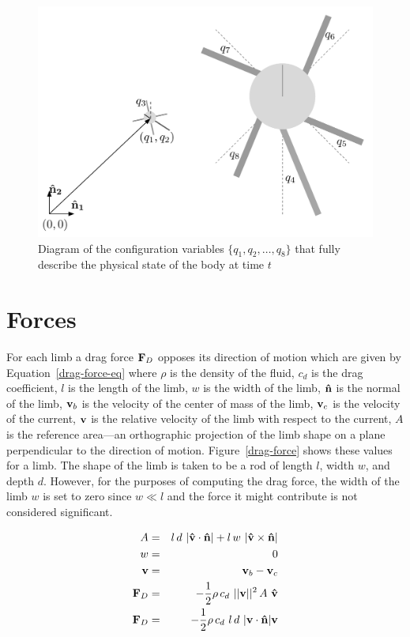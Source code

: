 \begin{figure}  
  \centering
  \includegraphics[scale=0.6]{fig/confvars-gs.pdf} 
  \caption[Diagram of configuration variables]{\label{confvars}Diagram
    of the configuration variables $\{q_1, q_2, \ldots, q_8\}$ that
    fully describe the physical state of the body at time $t$}
\end{figure}

\section{Forces}

For each limb a drag force $\mathbf{F}_D$ opposes its direction of motion
which are given by Equation~\ref{drag-force-eq} where $\rho$ is the
density of the fluid, $c_d$ is the drag coefficient, $l$ is the length
of the limb, $w$ is the width of the limb, $\mathbf{\hat{n}}$ is the normal of
the limb, $\mathbf{v}_b$ is the velocity of the center of mass of the limb,
$\mathbf{v}_c$ is the velocity of the current, $\mathbf{v}$ is the relative
velocity of the limb with respect to the current, $A$ is the reference
area---an orthographic projection of the limb shape on a plane
perpendicular to the direction of motion.  Figure~\ref{drag-force}
shows these values for a limb.  The shape of the limb is taken to be a
rod of length $l$, width $w$, and depth $d$.  However, for the
purposes of computing the drag force, the width of the limb $w$ is set
to zero since $w \ll l$ and the force it might contribute is not
considered significant.

\begin{eqnarray}
  A &=& l\,d~ |\mathbf{\hat{v}} \cdot \mathbf{\hat{n}}| + l\, w~|\mathbf{\hat{v}} \times \mathbf{\hat{n}}|\\
  w &=& 0 \\
  \mathbf{v} &=& \mathbf{v}_b - \mathbf{v}_c \\
  \mathbf{F}_D &=& -\frac{1}{2} \rho\,c_d~||\mathbf{v}||^2\,A~\mathbf{\hat{v}} \\
  \mathbf{F}_D &=& -\frac{1}{2} \rho\, c_d~ l\,d~|\mathbf{v} \cdot \mathbf{\hat{n}}|\mathbf{v} \label{drag-force-eq} 
\end{eqnarray}


